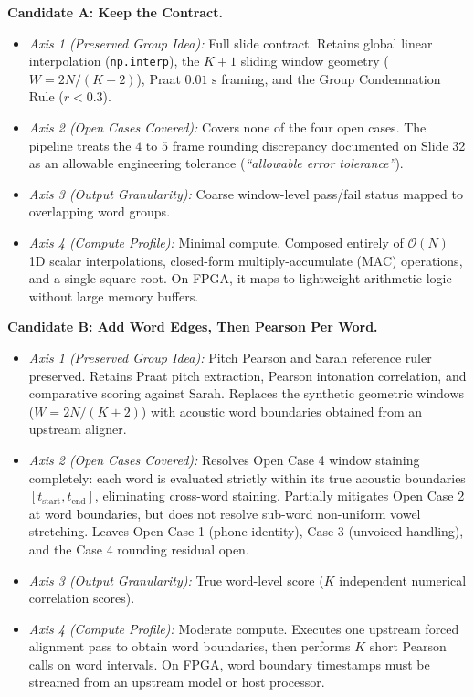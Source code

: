 \documentclass[11pt,a4paper]{article}
\begin{document}
\textbf{Candidate A: Keep the Contract.}
\begin{itemize}
    \item \textit{Axis 1 (Preserved Group Idea):} Full slide contract. Retains global linear interpolation (\texttt{np.interp}), the $K+1$ sliding window geometry ($W = 2N/(K+2)$), Praat $0.01\text{ s}$ framing, and the Group Condemnation Rule ($r < 0.3$).
    \item \textit{Axis 2 (Open Cases Covered):} Covers none of the four open cases. The pipeline treats the $4\text{ to }5$ frame rounding discrepancy documented on Slide 32 as an allowable engineering tolerance (\textit{``allowable error tolerance''}).
    \item \textit{Axis 3 (Output Granularity):} Coarse window-level pass/fail status mapped to overlapping word groups.
    \item \textit{Axis 4 (Compute Profile):} Minimal compute. Composed entirely of $\mathcal{O}(N)$ 1D scalar interpolations, closed-form multiply-accumulate (MAC) operations, and a single square root. On FPGA, it maps to lightweight arithmetic logic without large memory buffers.
\end{itemize}

\textbf{Candidate B: Add Word Edges, Then Pearson Per Word.}
\begin{itemize}
    \item \textit{Axis 1 (Preserved Group Idea):} Pitch Pearson and Sarah reference ruler preserved. Retains Praat pitch extraction, Pearson intonation correlation, and comparative scoring against Sarah. Replaces the synthetic geometric windows ($W = 2N/(K+2)$) with acoustic word boundaries obtained from an upstream aligner.
    \item \textit{Axis 2 (Open Cases Covered):} Resolves Open Case 4 window staining completely: each word is evaluated strictly within its true acoustic boundaries $[t_{\text{start}}, t_{\text{end}}]$, eliminating cross-word staining. Partially mitigates Open Case 2 at word boundaries, but does not resolve sub-word non-uniform vowel stretching. Leaves Open Case 1 (phone identity), Case 3 (unvoiced handling), and the Case 4 rounding residual open.
    \item \textit{Axis 3 (Output Granularity):} True word-level score ($K$ independent numerical correlation scores).
    \item \textit{Axis 4 (Compute Profile):} Moderate compute. Executes one upstream forced alignment pass to obtain word boundaries, then performs $K$ short Pearson calls on word intervals. On FPGA, word boundary timestamps must be streamed from an upstream model or host processor.
\end{itemize}
\end{document}
